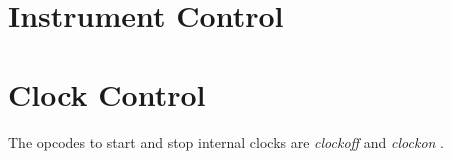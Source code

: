 \begin{comment}
\documentclass[10pt]{article}
\usepackage{fullpage, graphicx, url}
\setlength{\parskip}{1ex}
\setlength{\parindent}{0ex}
\title{Instrument Control}



\begin{tabular}{ccc}
The Alternative Csound Reference Manual & & \\
Previous & &Next

\end{tabular}

\end{comment}
\section{Instrument Control}
\section{Clock Control}


  The opcodes to start and stop internal clocks are \emph{clockoff}
 and \emph{clockon}
. 


\begin{comment}
\begin{tabular}{lcr}
Previous &Home &Next \\
Variable Initialization &Up &Conditional Values

\end{tabular}



\end{comment}
